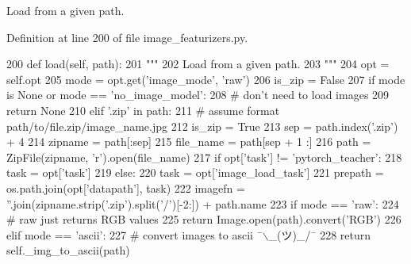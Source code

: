 \begin{DoxyVerb}Load from a given path.
\end{DoxyVerb}
 

Definition at line 200 of file image\+\_\+featurizers.\+py.


\begin{DoxyCode}
200     \textcolor{keyword}{def }load(self, path):
201         \textcolor{stringliteral}{"""}
202 \textcolor{stringliteral}{        Load from a given path.}
203 \textcolor{stringliteral}{        """}
204         opt = self.opt
205         mode = opt.get(\textcolor{stringliteral}{'image\_mode'}, \textcolor{stringliteral}{'raw'})
206         is\_zip = \textcolor{keyword}{False}
207         \textcolor{keywordflow}{if} mode \textcolor{keywordflow}{is} \textcolor{keywordtype}{None} \textcolor{keywordflow}{or} mode == \textcolor{stringliteral}{'no\_image\_model'}:
208             \textcolor{comment}{# don't need to load images}
209             \textcolor{keywordflow}{return} \textcolor{keywordtype}{None}
210         \textcolor{keywordflow}{elif} \textcolor{stringliteral}{'.zip'} \textcolor{keywordflow}{in} path:
211             \textcolor{comment}{# assume format path/to/file.zip/image\_name.jpg}
212             is\_zip = \textcolor{keyword}{True}
213             sep = path.index(\textcolor{stringliteral}{'.zip'}) + 4
214             zipname = path[:sep]
215             file\_name = path[sep + 1 :]
216             path = ZipFile(zipname, \textcolor{stringliteral}{'r').open(file\_name)}
217 \textcolor{stringliteral}{            }\textcolor{keywordflow}{if} opt[\textcolor{stringliteral}{'task'}] != \textcolor{stringliteral}{'pytorch\_teacher'}:
218                 task = opt[\textcolor{stringliteral}{'task'}]
219             \textcolor{keywordflow}{else}:
220                 task = opt[\textcolor{stringliteral}{'image\_load\_task'}]
221             prepath = os.path.join(opt[\textcolor{stringliteral}{'datapath'}], task)
222             imagefn = \textcolor{stringliteral}{''}.join(zipname.strip(\textcolor{stringliteral}{'.zip'}).split(\textcolor{stringliteral}{'/'})[-2:]) + path.name
223         \textcolor{keywordflow}{if} mode == \textcolor{stringliteral}{'raw'}:
224             \textcolor{comment}{# raw just returns RGB values}
225             \textcolor{keywordflow}{return} Image.open(path).convert(\textcolor{stringliteral}{'RGB'})
226         \textcolor{keywordflow}{elif} mode == \textcolor{stringliteral}{'ascii'}:
227             \textcolor{comment}{# convert images to ascii ¯\(\backslash\)\_(ツ)\_/¯}
228             \textcolor{keywordflow}{return} self.\_img\_to\_ascii(path)

\end{DoxyCode}

